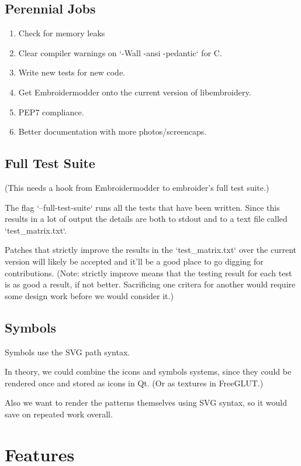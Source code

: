 \subsection{Perennial Jobs}

\begin{enumerate}
\item Check for memory leaks
\item Clear compiler warnings on `-Wall -ansi -pedantic` for C.
\item Write new tests for new code.
\item Get Embroidermodder onto the current version of libembroidery.
\item PEP7 compliance.
\item Better documentation with more photos/screencaps.
\end{enumerate}

\subsection{Full Test Suite}

(This needs a hook from Embroidermodder to embroider's full test suite.)

The flag `--full-test-suite` runs all the tests that have been written.
Since this results in a lot of output the details are both to stdout
and to a text file called `test\_matrix.txt`.

Patches that strictly improve the results in the `test\_matrix.txt` over
the current version will likely be accepted and it'll be a good place
to go digging for contributions. (Note: strictly improve means that
the testing result for each test is as good a result, if not better.
Sacrificing one critera for another would require some design work
before we would consider it.)

\subsection{Symbols}

Symbols use the SVG path syntax.

In theory, we could combine the icons and symbols systems, since they could be rendered once and stored as icons in Qt. (Or as textures in FreeGLUT.)

Also we want to render the patterns themselves using SVG syntax, so it would save on repeated work overall.


\section{Features}

